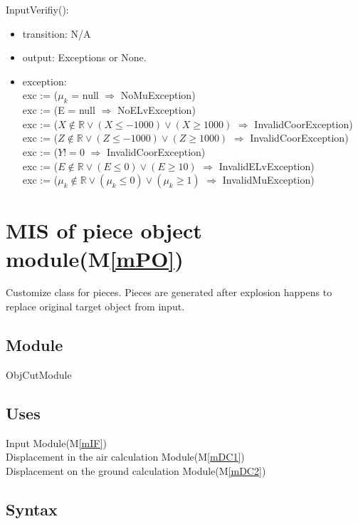 \documentclass[12pt, titlepage]{article}
\newcommand{\mref}[1]{M\ref{#1}}
\begin{document}
\noindent InputVerifiy():
\begin{itemize}
\item transition: N/A
\item output: Exceptions or None.
\item exception:\\
exc := ($\mu_{k}$ = null $\Rightarrow $ NoMuException)\\
exc := (E = null $\Rightarrow $ NoELvException)\\
exc := ($X \notin \mathbb{R} \vee (X \le -1000) \vee (X \ge 1000)$ $\Rightarrow $ InvalidCoorException)\\
exc := ($Z \notin \mathbb{R} \vee (Z \le -1000) \vee (Z \ge 1000)$ $\Rightarrow $ InvalidCoorException)\\
exc := ($Y != 0$ $\Rightarrow $ InvalidCoorException)\\
exc := ($E \notin \mathbb{R} \vee (E \leq 0) \vee (E \geq 10)$ $\Rightarrow $ InvalidELvException)\\
exc := ($\mu_{k} \notin \mathbb{R} \vee (\mu_{k} \le 0) \vee (\mu_{k} \ge 1)$ $\Rightarrow $ InvalidMuException)\\
\end{itemize}

\section{MIS of piece object module(\mref{mPO})}

Customize class for pieces. Pieces are generated after explosion happens to replace original target object from input.

\subsection{Module}

ObjCutModule

\subsection{Uses}

Input Module(\mref{mIF})\\
Displacement in the air calculation Module(\mref{mDC1})\\
Displacement on the ground calculation Module(\mref{mDC2})\\

\subsection{Syntax}
\end{document}
